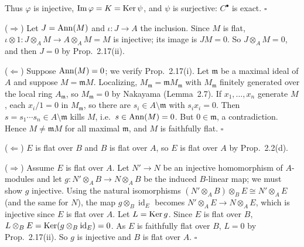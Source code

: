 \documentclass[11pt]{article}
\begin{document}
Thus $\varphi$ is injective, $\operatorname{Im}\varphi=K=\operatorname{Ker}\psi$, and $\psi$ is surjective: $C^\bullet$ is exact. \hfill$\square$

\pf
($\Rightarrow$) Let $J=\operatorname{Ann}(M)$ and $\iota:J\to A$ the inclusion. Since $M$ is flat, $\iota\otimes1:J\otimes_AM\to A\otimes_AM=M$ is injective; its image is $JM=0$. So $J\otimes_AM=0$, and then $J=0$ by Prop.~2.17(ii).

($\Leftarrow$) Suppose $\operatorname{Ann}(M)=0$; we verify Prop.~2.17(i). Let $\mathfrak m$ be a maximal ideal of $A$ and suppose $M=\mathfrak mM$. Localizing, $M_{\mathfrak m}=\mathfrak mM_{\mathfrak m}$ with $M_{\mathfrak m}$ finitely generated over the local ring $A_{\mathfrak m}$, so $M_{\mathfrak m}=0$ by Nakayama (Lemma~2.7). If $x_1,\dots,x_n$ generate $M$, each $x_i/1=0$ in $M_{\mathfrak m}$, so there are $s_i\in A\setminus\mathfrak m$ with $s_ix_i=0$. Then $s=s_1\cdots s_n\in A\setminus\mathfrak m$ kills $M$, i.e.\ $s\in\operatorname{Ann}(M)=0$. But $0\in\mathfrak m$, a contradiction. Hence $M\ne\mathfrak mM$ for all maximal $\mathfrak m$, and $M$ is faithfully flat. \hfill$\square$

\pf
($\Leftarrow$) $E$ is flat over $B$ and $B$ is flat over $A$, so $E$ is flat over $A$ by Prop.~2.2(d).

($\Rightarrow$) Assume $E$ is flat over $A$. Let $N'\to N$ be an injective homomorphism of $A$-modules and let $g:N'\otimes_AB\to N\otimes_AB$ be the induced $B$-linear map; we must show $g$ injective. Using the natural isomorphisms $(N'\otimes_AB)\otimes_BE\cong N'\otimes_AE$ (and the same for $N$), the map $g\otimes_B\operatorname{id}_E$ becomes $N'\otimes_AE\to N\otimes_AE$, which is injective since $E$ is flat over $A$. Let $L=\operatorname{Ker} g$. Since $E$ is flat over $B$, $L\otimes_BE=\operatorname{Ker}(g\otimes_B\operatorname{id}_E)=0$. As $E$ is faithfully flat over $B$, $L=0$ by Prop.~2.17(ii). So $g$ is injective and $B$ is flat over $A$. \hfill$\square$
\end{document}

